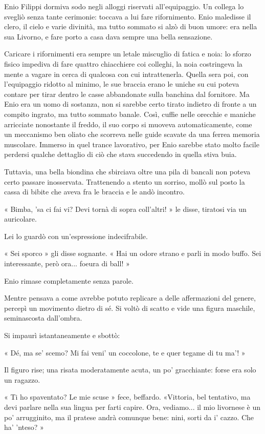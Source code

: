 Enio Filippi dormiva sodo negli alloggi riservati all'equipaggio. Un collega lo svegliò senza tante cerimonie: toccava a lui fare rifornimento. Enio maledisse il clero, il cielo e varie divinità, ma tutto sommato si alzò di buon umore: era nella sua Livorno, e fare porto a casa dava sempre una bella sensazione.

Caricare i rifornimenti era sempre un letale miscuglio di fatica e noia: lo sforzo fisico impediva di fare quattro chiacchiere coi colleghi, la noia costringeva la mente a vagare in cerca di qualcosa con cui intrattenerla. Quella sera poi, con l'equipaggio ridotto al minimo, le sue braccia erano le uniche su cui poteva contare per tirar dentro le casse abbandonate sulla banchina dal fornitore. Ma Enio era un uomo di sostanza, non si sarebbe certo tirato indietro di fronte a un compito ingrato, ma tutto sommato banale. Così, cuffie nelle orecchie e maniche arricciate nonostante il freddo, il suo corpo si muoveva automaticamente, come un meccanismo ben oliato che scorreva nelle guide scavate da una ferrea memoria muscolare. Immerso in quel trance lavorativo, per Enio sarebbe stato molto facile perdersi qualche dettaglio di ciò che stava succedendo in quella stiva buia.

Tuttavia, una bella biondina che sbirciava oltre una pila di bancali non poteva certo passare inosservata. Trattenendo a stento un sorriso, mollò sul posto la cassa di bibite che aveva fra le braccia e le andò incontro.

« Bimba, 'sa ci fai vi? Devi tornà di sopra coll'altri! » le disse, tiratosi via un auricolare.

Lei lo guardò con un'espressione indecifrabile.

« Sei sporco » gli disse sognante. « Hai un odore strano e parli in modo buffo. Sei interessante, però ora... foeura di ball! »

Enio rimase completamente senza parole.

Mentre pensava a come avrebbe potuto replicare a delle affermazioni del genere, percepì un movimento dietro di sé. Si voltò di scatto e vide una figura maschile, seminascosta dall'ombra.

Si impaurì istantaneamente e sbottò:

« Dé, ma se' scemo? Mi fai veni' un coccolone, te e quer tegame di tu ma'! »

Il figuro rise; una risata moderatamente acuta, un po' gracchiante: forse era solo un ragazzo.

« Ti ho spaventato? Le mie scuse » fece, beffardo. «Vittoria, bel tentativo, ma devi parlare nella sua lingua per farti capire. Ora, vediamo... il mio livornese è un po' arrugginito, ma il pratese andrà comunque bene: nini, sorti da i' cazzo. Che ha' 'nteso? »

